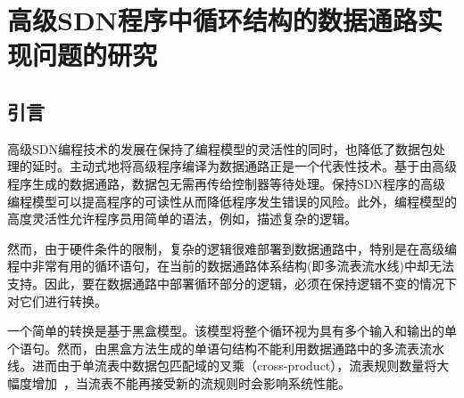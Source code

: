 \chapter{高级SDN程序中循环结构的数据通路实现问题的研究} 
%
%




\section{引言} 
\label{sec:intro}

高级SDN编程技术的发展在保持了编程模型的灵活性的同时，也降低了数据包处理的延时。主动式地将高级程序编译为数据通路正是一个代表性技术。基于由高级程序生成的数据通路，数据包无需再传给控制器等待处理。保持SDN程序的高级编程模型可以提高程序的可读性从而降低程序发生错误的风险。此外，编程模型的高度灵活性允许程序员用简单的语法，例如，描述复杂的逻辑。

然而，由于硬件条件的限制，复杂的逻辑很难部署到数据通路中，特别是在高级编程中非常有用的循环语句，在当前的数据通路体系结构(即多流表流水线)中却无法支持。因此，要在数据通路中部署循环部分的逻辑，必须在保持逻辑不变的情况下对它们进行转换。

一个简单的转换是基于黑盒模型。该模型将整个循环视为具有多个输入和输出的单个语句。然而，由黑盒方法生成的单语句结构不能利用数据通路中的多流表流水线。进而由于单流表中数据包匹配域的叉乘（cross-product），流表规则数量将大幅度增加~\cite{openflow1-3-1}，当流表不能再接受新的流规则时会影响系统性能。

